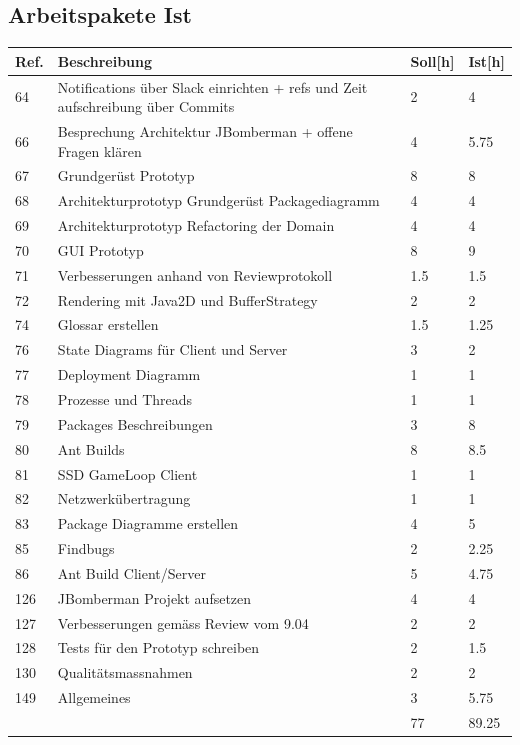 \documentclass[11pt]{scrartcl}
\begin{document}
  \subsection{Arbeitspakete Ist}
\begin{longtabu} to \textwidth {
    X[1,l]
    X[10,l]
    X[1,l]
     X[1,l]}
    \bf{Ref.}  & \bf{Beschreibung} & \bf{Soll[h]} & \bf{Ist[h]}\\
    \hline
    64 & Notifications über Slack einrichten + refs und Zeit aufschreibung über Commits & 2 & 4 \\
    66 & Besprechung Architektur JBomberman + offene Fragen klären & 4 & 5.75\\
    67 &  Grundgerüst Prototyp & 8 & 8\\
    68 & Architekturprototyp Grundgerüst Packagediagramm & 4 & 4\\
    69 &  Architekturprototyp Refactoring der Domain & 4 & 4\\
    70 & GUI Prototyp & 8 & 9\\
    71 & 	Verbesserungen anhand von Reviewprotokoll & 1.5 & 1.5\\
    72 & Rendering mit Java2D und BufferStrategy & 2 & 2\\
    74 & Glossar erstellen  & 1.5 & 1.25\\
    76 & State Diagrams für Client und Server & 3 & 2\\
    77 & Deployment Diagramm & 1 & 1\\
    78 & 	Prozesse und Threads & 1 & 1\\
    79 & 	Packages Beschreibungen & 3 & 8\\
    80 & Ant Builds & 8 & 8.5\\
    81 & SSD GameLoop Client & 1 & 1\\
    82 & Netzwerkübertragung & 1 & 1\\
    83 & Package Diagramme erstellen & 4 & 5\\
    85 & 	Findbugs & 2 & 2.25\\
    86 & Ant Build Client/Server & 5 & 4.75\\
    126 & JBomberman Projekt aufsetzen & 4 & 4\\
    127 & Verbesserungen gemäss Review vom 9.04 & 2 & 2\\
    128 & Tests für den Prototyp schreiben & 2 & 1.5 \\
    130 & Qualitätsmassnahmen	& 2 & 2\\
    149 & Allgemeines & 3 & 5.75 \\
    \hline
    & & 77 & 89.25
    \end{longtabu}
\end{document}
